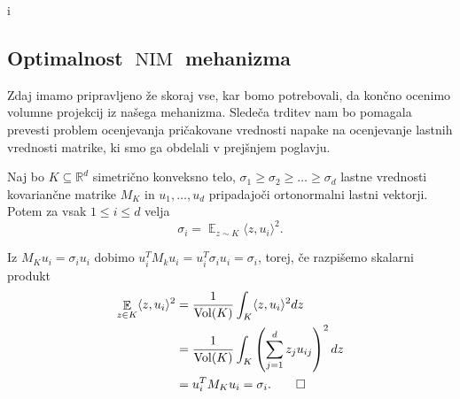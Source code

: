 i\documentclass[mat1]{fmfdelo}
\newcommand{\R}{\mathbb R}
\DeclareMathOperator*{\E}{\mathbb E}
\DeclareMathOperator{\Vol}{Vol}
\DeclareMathOperator{\NIM}{NIM}
\begin{document}
\subsection{\texorpdfstring{Optimalnost $\NIM$ mehanizma}{Optimalnost NIM mehanizma}}

Zdaj imamo pripravljeno že skoraj vse, kar bomo potrebovali, da končno ocenimo volumne projekcij iz našega mehanizma. Sledeča trditev nam bo pomagala prevesti problem ocenjevanja pričakovane vrednosti napake na ocenjevanje lastnih vrednosti matrike, ki smo ga obdelali v prejšnjem poglavju.

\begin{trditev} \label{eigenlel}
    Naj bo $K \subseteq \R^d$ simetrično konveksno telo, $\sigma_1 \geq \sigma_2 \geq \dots \geq \sigma_d$ lastne vrednosti kovariančne matrike $M_K$ in $u_1,\dots,u_d$ pripadajoči ortonormalni lastni vektorji. Potem za vsak $1 \leq i \leq d$ velja
    \begin{equation*}
        \sigma_i = \E_{z \sim K} \langle z, u_i \rangle^2.
    \end{equation*}
\end{trditev}

\begin{dokaz}
    Iz $M_K u_i = \sigma_i u_i$ dobimo $u_i^T M_k u_i = u_i^T \sigma_i u_i = \sigma_i$, torej, če razpišemo skalarni produkt
    \begin{align*}
        \E_{z \in K} \langle z, u_i \rangle^2 &= \frac{1}{\Vol(K)} \int_K \langle z, u_i \rangle^2 dz \\
        &= \frac{1}{\Vol(K)} \int_K \left(\sum_{j=1}^d z_j u_{ij}\right)^2 dz \\
        &= u_i^T M_K u_i = \sigma_i. \qedhere
    \end{align*}
\end{dokaz}
\end{document}
